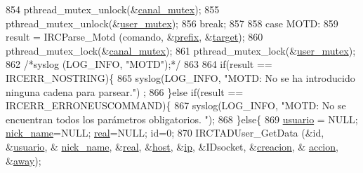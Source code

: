 \begin{DoxyCode}
{{{{{{{{{{854                         pthread\_mutex\_unlock(&\hyperlink{_g-2361-06-_p1-_server_8c_ab86a544a49de18195048bac54dd3ac3e}{canal\_mutex});
855                         pthread\_mutex\_unlock(&\hyperlink{_g-2361-06-_p1-_server_8c_a5dedd07a1144d2ab70b74a8e64b6a7c0}{user\_mutex});
856                         \textcolor{keywordflow}{break};
857 
858                 \textcolor{keywordflow}{case} MOTD:
859                         result = IRCParse\_Motd (comando, &\hyperlink{_g-2361-06-_p1-_server_8c_ad2849cf781a4db22cc1b31eaaee50a4f}{prefix}, &\hyperlink{_g-2361-06-_p1-_server_8c_a23b26cdb3a71f525caf03b57f68d47fa}{target});
860                         pthread\_mutex\_lock(&\hyperlink{_g-2361-06-_p1-_server_8c_ab86a544a49de18195048bac54dd3ac3e}{canal\_mutex});
861                         pthread\_mutex\_lock(&\hyperlink{_g-2361-06-_p1-_server_8c_a5dedd07a1144d2ab70b74a8e64b6a7c0}{user\_mutex});
862                         \textcolor{comment}{/*syslog (LOG\_INFO, "MOTD");*/}
863 
864                         \textcolor{keywordflow}{if}(result == IRCERR\_NOSTRING)\{
865                                 syslog(LOG\_INFO, \textcolor{stringliteral}{"MOTD: No se ha introducido ninguna cadena para parsear."})
      ;
866                         \}\textcolor{keywordflow}{else} \textcolor{keywordflow}{if}(result == IRCERR\_ERRONEUSCOMMAND)\{
867                                 syslog(LOG\_INFO, \textcolor{stringliteral}{"MOTD: No se encuentran todos los parámetros obligatorios.
      "});
868                         \}\textcolor{keywordflow}{else}\{
869                                 \hyperlink{_g-2361-06-_p1-_server_8c_a0147a5b81499984f9cb00379a8cb84af}{usuario} = NULL; \hyperlink{_g-2361-06-_p1-_server_8c_aabbf66718cda228b924a4a9441eadf62}{nick\_name}=NULL; 
      \hyperlink{_g-2361-06-_p1-_server_8c_af832f551e1c343666c3d2a55834139a0}{real}=NULL; \textcolor{keywordtype}{id}=0;
870                                 IRCTADUser\_GetData (&\textcolor{keywordtype}{id}, &\hyperlink{_g-2361-06-_p1-_server_8c_a0147a5b81499984f9cb00379a8cb84af}{usuario}, &
      \hyperlink{_g-2361-06-_p1-_server_8c_aabbf66718cda228b924a4a9441eadf62}{nick\_name}, &\hyperlink{_g-2361-06-_p1-_server_8c_af832f551e1c343666c3d2a55834139a0}{real}, &\hyperlink{_g-2361-06-_p1-_server_8c_a1c2046dcb30a629d6d9f45ff8f403f12}{host}, &\hyperlink{_g-2361-06-_p1-_server_8c_afbc356cd0e25d1dbbece7c10fd025fa6}{ip}, &IDsocket, &\hyperlink{_g-2361-06-_p1-_server_8c_a26292066ca0d17922eadee4161542ab9}{creacion}, &
      \hyperlink{_g-2361-06-_p1-_server_8c_a93e785c991445d8b8ee99c2e51242d5a}{accion}, &\hyperlink{_g-2361-06-_p1-_server_8c_adf86742e21384f58f8999d8317e6a370}{away});
}}}}}}}}}}
\end{DoxyCode}
